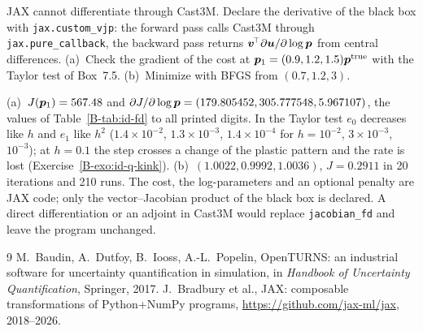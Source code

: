 \label{exo:cc-id-jax}
%
JAX cannot differentiate through Cast3M. Declare the derivative of the black
box with \texttt{jax.custom\_vjp}: the forward pass calls Cast3M through
\texttt{jax.pure\_callback}, the backward pass returns
$\bm{v}^{\!\top}\partial\bm{u}/\partial\log\bm{p}$ from central differences. (a)~Check
the gradient of the cost at $\bm{p}_1=(0.9,1.2,1.5)\bm{p}^{\mathrm{true}}$ with the
Taylor test of Box~7.5. (b)~Minimize with BFGS from $(0.7,1.2,3)$.
\begin{solution}
(a)~$J(\bm{p}_1)=567.48$ and $\partial J/\partial\log\bm{p}=(179.805452,
305.777548,5.967107)$, the values of Table~\ref{B-tab:id-fd} to all printed
digits. In the Taylor test $e_0$ decreases like $h$ and $e_1$ like $h^2$
($1.4\times10^{-2}$, $1.3\times10^{-3}$, $1.4\times10^{-4}$ for $h=10^{-2}$,
$3\times10^{-3}$, $10^{-3}$); at $h=0.1$ the step crosses a change of the
plastic pattern and the rate is lost (Exercise~\ref{B-exo:id-q-kink}).
(b)~$(1.0022,0.9992,1.0036)$, $J=0.2911$ in 20 iterations and 210 runs. The
cost, the log-parameters and an optional penalty are JAX code; only the
vector--Jacobian product of the black box is declared. A direct differentiation
or an adjoint in Cast3M would replace \texttt{jacobian\_fd} and leave the
program unchanged.

\end{solution}

\begin{chapterbib}{9}
 M.~Baudin, A.~Dutfoy, B.~Iooss, A.-L.~Popelin, OpenTURNS: an
  industrial software for uncertainty quantification in simulation, in
  \emph{Handbook of Uncertainty Quantification}, Springer, 2017.
 J.~Bradbury et al., JAX: composable transformations of
  Python+NumPy programs, \url{https://github.com/jax-ml/jax}, 2018--2026.
\end{chapterbib}
